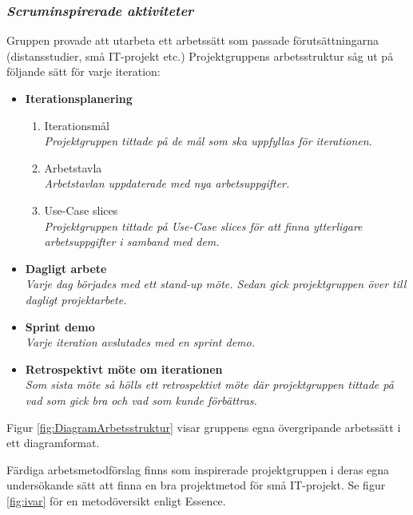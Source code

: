 \documentclass[conference]{IEEEtran}
\begin{document}
\subsubsection{\textit{Scruminspirerade aktiviteter}}
Gruppen provade att utarbeta ett arbetssätt som passade förutsättningarna (distansstudier, små IT-projekt etc.) Projektgruppens arbetsstruktur såg ut på följande sätt för varje 
iteration:
\begin{itemize}
    \item \textbf{Iterationsplanering}
    \begin{enumerate}
        \item Iterationsmål\\
        \textit{Projektgruppen tittade på de mål som ska uppfyllas för iterationen.}
        \item Arbetstavla\\
        \textit{Arbetstavlan uppdaterade med nya arbetsuppgifter.}
        \item Use-Case slices\\
        \textit{Projektgruppen tittade på Use-Case slices för att finna ytterligare arbetsuppgifter i samband med dem.}
    \end{enumerate}
    \item \textbf{Dagligt arbete}\\
        \textit{Varje dag börjades med ett stand-up möte. Sedan gick projektgruppen över till dagligt projektarbete.}
    \item \textbf{Sprint demo}\\
    \textit{Varje iteration avslutades med en sprint demo.}
    \item \textbf{Retrospektivt möte om iterationen}\\
    \textit{Som sista möte så hölls ett retrospektivt möte där projektgruppen tittade på vad som gick bra och vad som kunde förbättras.}
\end{itemize}
Figur \ref{fig:DiagramArbetsstruktur} visar gruppens egna övergripande arbetssätt i ett diagramformat.

Färdiga arbetsmetodförslag finns som inspirerade projektgruppen i deras egna undersökande sätt att finna en bra projektmetod för små IT-projekt. Se figur \ref{fig:ivar} för 
en metodöversikt enligt Essence.
\end{document}
